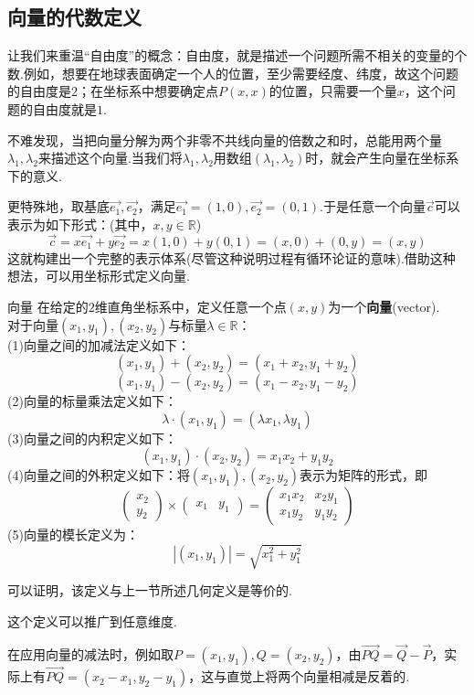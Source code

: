 \documentclass[lang=cn, zihao=5]{elegantbook}
\newcommand{\xl}[1]{\overrightarrow{#1}}
\newcommand{\R}{\mathbb{R}}
\begin{document}
\subsection{向量的代数定义}

让我们来重温“自由度”的概念：自由度，就是描述一个问题所需不相关的变量的个数.例如，想要在地球表面确定一个人的位置，至少需要经度、纬度，故这个问题的自由度是$2$；在坐标系中想要确定点$P(x,x)$的位置，只需要一个量$x$，这个问题的自由度就是$1$.

不难发现，当把向量分解为两个非零不共线向量的倍数之和时，总能用两个量$\lambda _1,\lambda _2$来描述这个向量.当我们将$\lambda _1,\lambda _2$用数组$(\lambda _1,\lambda _2)$时，就会产生向量在坐标系下的意义.

更特殊地，取基底$\vec{e_1},\vec{e_2}$，满足$\vec{e_1}=(1,0),\vec{e_2}=(0,1)$.于是任意一个向量$\vec{c}$可以表示为如下形式：(其中，$x,y \in \R$)$$\vec{c}=x\vec{e_1}+y\vec{e_2}=x(1,0)+y(0,1)=(x,0)+(0,y)=(x,y)$$
这就构建出一个完整的表示体系(尽管这种说明过程有循环论证的意味).借助这种想法，可以用坐标形式定义向量.

\begin{definition}{向量}
	在给定的$2$维直角坐标系中，定义任意一个点$(x,y)$为一个\textbf{向量}(vector). \\
	对于向量$(x_1,y_1),(x_2,y_2)$与标量$\lambda \in \R$： \\
	(1)向量之间的加减法定义如下：
	$$(x_1,y_1) + (x_2,y_2) = (x_1+x_2,y_1+y_2)$$
	$$(x_1,y_1) - (x_2,y_2) = (x_1-x_2,y_1-y_2)$$
	(2)向量的标量乘法定义如下：$$\lambda \cdot (x_1,y_1) = (\lambda x_1, \lambda y_1)$$
	(3)向量之间的内积定义如下：$$(x_1,y_1) \cdot (x_2,y_2) = x_1x_2 + y_1y_2$$
	(4)向量之间的外积定义如下：将$(x_1,y_1),(x_2,y_2)$表示为矩阵的形式，即$$\begin{pmatrix}
		x_2 \\ y_2 \end{pmatrix} \times \begin{pmatrix}
			x_1 & y_1 \end{pmatrix} = \begin{pmatrix}
				x_1x_2 & x_2y_1 \\ x_1y_2 & y_1y_2
			\end{pmatrix}$$
	(5)向量的模长定义为：$$|(x_1,y_1)|=\sqrt{x_1^2+y_1^2}$$
\end{definition}
\begin{remark}
	可以证明，该定义与上一节所述几何定义是等价的.
\end{remark}
\begin{remark}
	这个定义可以推广到任意维度.
\end{remark}
\begin{note}
	在应用向量的减法时，例如取$P=(x_1,y_1),Q=(x_2,y_2)$，由$\xl{PQ}=\xl{Q}-\xl{P}$，实际上有$\xl{PQ}=(x_2-x_1,y_2-y_1)$，这与直觉上将两个向量相减是反着的.
\end{note}
\end{document}
